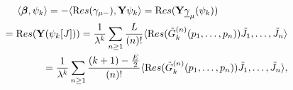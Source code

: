 \begin{equation}
\begin{split}
\langle\boldsymbol\beta, \psi_{k}\rangle=-\langle {\text Res}(\gamma_{\mu -}),{\bf Y}\psi_{k}\rangle
={\text Res}( {\bf Y}{\underline \gamma}_{\mu}(\psi_{k}))\hspace{70pt}\\
={\text Res}( {\bf Y}(\psi_{k}[J]))
=\frac{1}{\lambda^{k}}\sum_{n\geq 1}\frac{L}{(n)!} \langle{\text Res}({\tilde G}_{k}^{(n)}(p_1, \dots, p_{n})){\tilde J}_{1}, \dots ,{\tilde J}_{n} \rangle\\
=\frac{1}{\lambda^{k}}\sum_{n\geq 1}\frac{(k+1)-\frac{E}{2}}{(n)!}\langle{\text Res}({\tilde G}_{k}^{(n)}(p_1, \dots, p_{n})){\tilde J}_{1}, \dots ,{\tilde J}_{n} \rangle,\label{z.4}
\end{split}
\end{equation}

